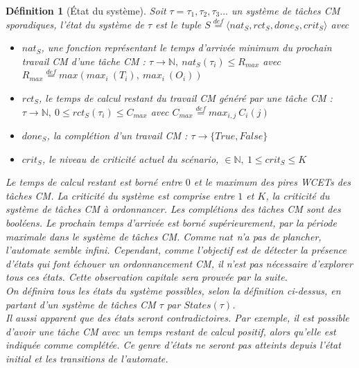 \documentclass[12pt,a4paper,oneside]{book}
\theoremstyle{break}
\newtheorem{defin}{Définition}[chapter]
\theoremstyle{breakplain}
\begin{document}
\begin{defin}[État du système]
\label{systemstate}
Soit $\tau = \tau_1, \tau_2, \tau_3 ...$ un système de tâches CM sporadiques, l'état du système de $\tau$ est le tuple $S \overset{def}{=} \langle nat_S, rct_S, done_S, crit_S \rangle$ avec

\begin{itemize}
\item $nat_S$, une fonction représentant le temps d'arrivée minimum du prochain travail CM d'une tâche CM : $\tau \rightarrow \mathbb{N},\ nat_S(\tau_i) \leq R_{max}$ avec $R_{max} \overset{def}{=} max(max_i\ (T_i),\ max_i\ (O_i))$
\item $rct_S$, le temps de calcul restant du travail CM généré par une tâche CM : $ \tau \rightarrow \mathbb{N},\ 0 \leq rct_S(\tau_i) \leq C_{max}$ avec $C_{max} \overset{def}{=} max_{i,j}\ C_i(j)$
\item $done_S$, la complétion d'un travail CM : $ \tau \rightarrow \{True,False\}$
\item $crit_S$, le niveau de criticité actuel du scénario, $ \in \mathbb{N},\ 1 \leq crit_S \leq K$\\
\end{itemize}

Le temps de calcul restant est borné entre $0$ et le maximum des pires WCETs des tâches CM. La criticité du système est comprise entre $1$ et $K$, la criticité du système de tâches CM à ordonnancer. Les complétions des tâches CM sont des booléens. Le prochain temps d'arrivée est borné supérieurement, par la période maximale dans le système de tâches CM. Comme $nat$ n'a pas de plancher, l'automate semble infini. Cependant, comme l'objectif est de détecter la présence d'états qui font échouer un ordonnancement CM, il n'est pas nécessaire d'explorer tous ces états. Cette observation capitale sera prouvée par la suite.\\

On définira tous les états du système possibles, selon la définition ci-dessus, en partant d'un système de tâches CM $\tau$ par $States(\tau)$.\\

Il aussi apparent que des états seront contradictoires. Par exemple, il est possible d'avoir une tâche CM avec un temps restant de calcul positif, alors qu'elle est indiquée comme complétée. Ce genre d'états ne seront pas atteints depuis l'état initial et les transitions de l'automate.
\end{defin}
\end{document}
